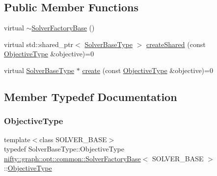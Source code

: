 \subsection*{Public Member Functions}
\begin{DoxyCompactItemize}
\item 
virtual \hyperlink{classnifty_1_1graph_1_1opt_1_1common_1_1SolverFactoryBase_ad25f0290b6bbc006dd2bf604a4dc94f4}{$\sim$\+Solver\+Factory\+Base} ()
\item 
virtual std\+::shared\+\_\+ptr$<$ \hyperlink{classnifty_1_1graph_1_1opt_1_1common_1_1SolverFactoryBase_a83f347591f4cffa7afb13c8f495dcce2}{Solver\+Base\+Type} $>$ \hyperlink{classnifty_1_1graph_1_1opt_1_1common_1_1SolverFactoryBase_a95a2e4e53959b7fb168d8ab707b3d4a7}{create\+Shared} (const \hyperlink{classnifty_1_1graph_1_1opt_1_1common_1_1SolverFactoryBase_ab71d93640cf3fbc0bc980450d5db6e45}{Objective\+Type} \&objective)=0
\item 
virtual \hyperlink{classnifty_1_1graph_1_1opt_1_1common_1_1SolverFactoryBase_a83f347591f4cffa7afb13c8f495dcce2}{Solver\+Base\+Type} $\ast$ \hyperlink{classnifty_1_1graph_1_1opt_1_1common_1_1SolverFactoryBase_a590dfdc8643a663d8c8adca6164de8f7}{create} (const \hyperlink{classnifty_1_1graph_1_1opt_1_1common_1_1SolverFactoryBase_ab71d93640cf3fbc0bc980450d5db6e45}{Objective\+Type} \&objective)=0
\end{DoxyCompactItemize}


\subsection{Member Typedef Documentation}
\mbox{\label{classnifty_1_1graph_1_1opt_1_1common_1_1SolverFactoryBase_ab71d93640cf3fbc0bc980450d5db6e45}} 
\subsubsection{\texorpdfstring{Objective\+Type}{ObjectiveType}}
{\footnotesize\ttfamily template$<$class S\+O\+L\+V\+E\+R\+\_\+\+B\+A\+SE$>$ \\
typedef Solver\+Base\+Type\+::\+Objective\+Type \hyperlink{classnifty_1_1graph_1_1opt_1_1common_1_1SolverFactoryBase}{nifty\+::graph\+::opt\+::common\+::\+Solver\+Factory\+Base}$<$ S\+O\+L\+V\+E\+R\+\_\+\+B\+A\+SE $>$\+::\hyperlink{classnifty_1_1graph_1_1opt_1_1common_1_1SolverFactoryBase_ab71d93640cf3fbc0bc980450d5db6e45}{Objective\+Type}}

